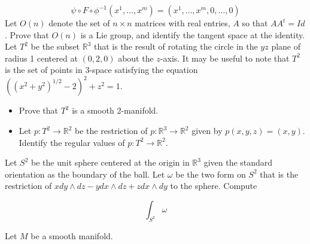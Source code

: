 \documentclass[14pt]{extarticle}
\begin{document}
$$
\psi \circ F \circ \phi^{-1}\left(x^{1}, \ldots, x^{m}\right)=\left(x^{1}, \ldots, x^{m}, 0, \ldots, 0\right)
$$
\newpage
 Let $O(n)$ denote the set of $n \times n$ matrices with real entries, $A$ so that $A A^{t}=I d$. Prove that $O(n)$ is a Lie group, and identify the tangent space at the identity.
\newpage
 Let $T^{2}$ be the subset $\mathbb{R}^{3}$ that is the result of rotating the circle in the $y z$ plane of radius 1 centered at $(0,2,0)$ about the $z$-axis. It may be useful to note that $T^{2}$ is the set of points in 3-space satisfying the equation $\left(\left(x^{2}+y^{2}\right)^{1 / 2}-2\right)^{2}+z^{2}=1 .$
\begin{itemize}
  \item Prove that $T^{2}$ is a smooth 2-manifold.

  \item Let $p: T^{2} \rightarrow \mathbb{R}^{2}$ be the restriction of $p: \mathbb{R}^{3} \rightarrow \mathbb{R}^{2}$ given by $p(x, y, z)=(x, y)$. Identify the regular values of $p: T^{2} \rightarrow \mathbb{R}^{2}$.

\end{itemize}
\newpage
 Let $S^{2}$ be the unit sphere centered at the origin in $\mathbb{R}^{3}$ given the standard orientation as the boundary of the ball. Let $\omega$ be the two form on $S^{2}$ that is the restriction of $x d y \wedge d z-y d x \wedge d z+z d x \wedge d y$ to the sphere. Compute

$$
\int_{S^{2}} \omega
$$

\newpage
Let $M$ be a smooth manifold.
\end{document}
